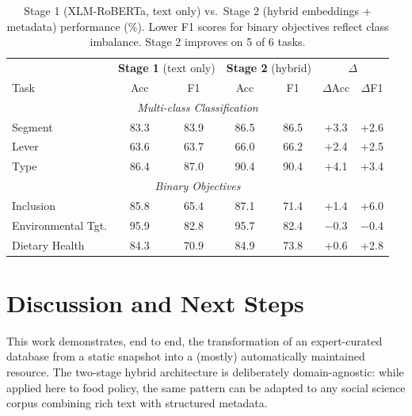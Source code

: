 \documentclass[a4paper,12pt]{article}
\begin{document}
\begin{table}[h]
    \centering
    \small
    \begin{tabular}{l|cc|cc|cc}
        \toprule
         & \multicolumn{2}{c|}{\textbf{Stage 1} (text only)} & \multicolumn{2}{c|}{\textbf{Stage 2} (hybrid)} & \multicolumn{2}{c}{\textbf{$\Delta$}} \\
         Task & Acc & F1 & Acc & F1 & $\Delta$Acc & $\Delta$F1 \\
         \midrule
         \multicolumn{7}{c}{\textit{Multi-class Classification}} \\
         \midrule
         Segment & 83.3 & 83.9 & 86.5 & 86.5 & +3.3 & +2.6 \\
         Lever    & 63.6 & 63.7 & 66.0 & 66.2 & +2.4 & +2.5 \\
         Type     & 86.4 & 87.0 & 90.4 & 90.4 & +4.1 & +3.4 \\
         \midrule
         \multicolumn{7}{c}{\textit{Binary Objectives}} \\
         \midrule
         Inclusion          & 85.8 & 65.4 & 87.1 & 71.4 & +1.4 & +6.0 \\
         Environmental Tgt. & 95.9 & 82.8 & 95.7 & 82.4 & $-$0.3 & $-$0.4 \\
         Dietary Health     & 84.3 & 70.9 & 84.9 & 73.8 & +0.6 & +2.8 \\
         \bottomrule
    \end{tabular}
    \caption{Stage 1 (XLM-RoBERTa, text only) vs.\ Stage 2 (hybrid embeddings + metadata) performance (\%). Lower F1 scores for binary objectives reflect class imbalance. Stage 2 improves on 5 of 6 tasks.}
    \label{tab:results}
\end{table}

\section*{Discussion and Next Steps}

This work demonstrates, end to end, the transformation of an expert-curated database from a static snapshot into a (mostly) automatically maintained resource. The two-stage hybrid architecture is deliberately domain-agnostic: while applied here to food policy, the same pattern can be adapted to any social science corpus combining rich text with structured metadata. \newline
\end{document}
